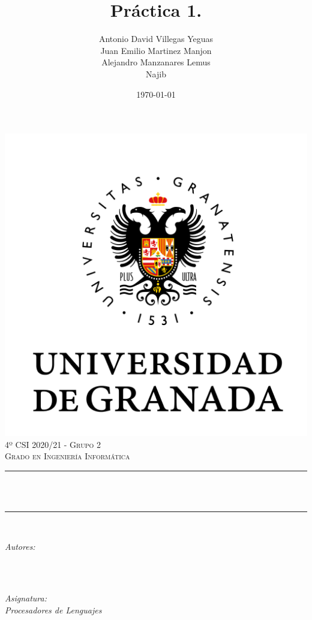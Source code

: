 \documentclass[12pt, spanish]{article}
\title{Práctica 1.\\
  \hspace{0.05cm} }
\author{Antonio David Villegas Yeguas\\
		Juan Emilio Martinez Manjon\\
		Alejandro Manzanares Lemus\\
		Najib}
\date{\today}
\makeatletter
\let\thetitle\@title
\let\theauthor\@author
\makeatother
\begin{document}

\begin{titlepage}
    \centering
    \vspace*{0.3 cm}
    \includegraphics[scale = 0.50]{ugr.png}\\[0.7 cm]
    \textsc{\large 4º CSI 2020/21 - Grupo 2}\\[0.5 cm]
    \textsc{\large Grado en Ingeniería Informática}\\[0.5 cm]
    \rule{\linewidth}{0.2 mm} \\[0.2 cm]
    { \huge \bfseries \thetitle}\\
    \rule{\linewidth}{0.2 mm} \\[1 cm]

    \begin{minipage}{0.4\textwidth}
        \begin{flushleft} \large
            \emph{Autores:}\\
            \theauthor\\
            \end{flushleft}
            \end{minipage}~
            \begin{minipage}{0.4\textwidth}
            \begin{flushright} \large
            \emph{Asignatura: \\
            Procesadores de Lenguajes}   \\


\end{flushright}
\end{minipage}
\end{titlepage}
\end{document}
